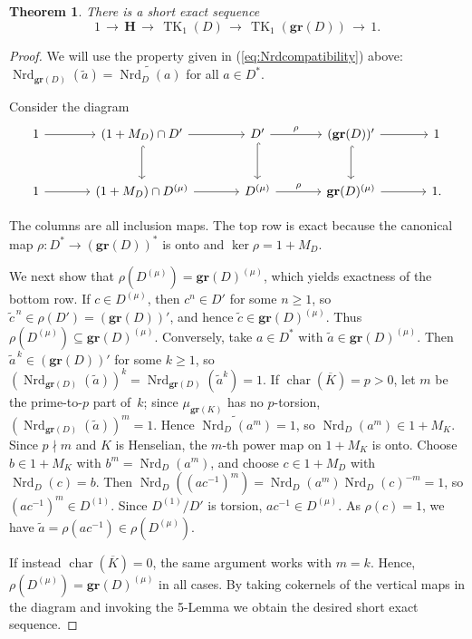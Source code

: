 \documentclass[11pt]{article}
\numberwithin{equation}{section}
\theoremstyle{plain}
\newtheorem{theorem}{Theorem}[section]
\theoremstyle{remark}
\newcommand{\gr}{\mathbf{gr}}
\newcommand{\opn}{\operatorname}
\newcommand{\Dmu}{D^{(\mu)}}
\newcommand{\Nrd}{\opn{Nrd}}
\newcommand{\upmu}{{(\mu)}}
\begin{document}
\begin{theorem}
\label{thm:valued-tk1-exact-sequence}
There is a short exact sequence
\begin{equation}
\label{SESforH}
        1\,\longrightarrow \,\mathbf{H}\,\longrightarrow \,\operatorname{TK}_1(D)\,\longrightarrow\, 
        \operatorname{TK}_1(\gr(D))\,\longrightarrow \,1.
\end{equation}

\end{theorem}
\begin{proof}
We will use  the property  given in (\ref{eq:Nrdcompatibility}) above:  $\operatorname{Nrd}_{\gr(D)}(\widetilde a)=\widetilde{\operatorname{Nrd}_D(a)}$ for all $a\in D^*$.

 Consider the diagram
$$
\begin{tikzcd}[column sep=large,row sep=large]
1 \arrow[r]
& (1+M_D)\cap D' \arrow[r] \arrow[d,hook]
& D' \arrow[r,"\rho"] \arrow[d,hook]
& (\gr(D))' \arrow[r] \arrow[d,hook]
& 1 \\
1 \arrow[r]
& (1+M_D)\cap \Dmu \arrow[r]
& \Dmu  \arrow[r,"\rho"]
& \gr(D)^{(\mu)} \arrow[r]
& 1 .
\end{tikzcd}
$$

The columns are all inclusion maps.
The top row is exact because the canonical map ${\rho\colon D^*\to(\gr(D))^*}$ is onto and $\ker\rho=1+M_D$. 

We next show that 
$\rho(\Dmu)=\gr(D)^{(\mu)}$, which yields exactness of the bottom row.
If ${c\in \Dmu}$, then $c^n\in D'$ for some $n\ge 1$, so $\widetilde c^{\,n}\in\rho(D')=(\gr(D))'$, 
and hence $\widetilde c\in \gr(D)^\upmu$. Thus 
${\rho(\Dmu)\subseteq \gr(D)^\upmu}$. Conversely, take $a\in D^*$ with 
$\widetilde a\in \gr(D)^\upmu$. Then $\widetilde a^{\,k}\in(\gr(D))'$ 
for some $k\geq1$, so $(\Nrd_{\gr(D)}(\widetilde a))^k = \Nrd_{\gr(D)}(\widetilde a^k)=1$. 
If $\operatorname{char}(\overline K)=p>0$, 
let $m$ be the prime-to-$p$ part of~$k$; since $\mu_{\gr(K)}$ has no $p$-torsion, $(\Nrd_{\gr(D)}(\widetilde a))^m=1$. 
Hence $\widetilde{\Nrd_D(a^m)}=1$, so $\operatorname{Nrd}_D(a^m)\in1+M_K$. Since $p\nmid m$ and 
$K$ is Henselian, the $m$-th power map on $1+M_K$ is onto. Choose $b\in1+M_K$ with $b^m=\Nrd_D(a^m)$, and 
choose $c\in1+M_D$ with $\Nrd_D(c)=b$. Then $\Nrd_D((ac^{-1})^m) =\Nrd_D(a^m)\Nrd_D(c)^{-m}=1$, 
so $(ac^{-1})^m\in D^{(1)}$. Since $D^{(1)}/D'$ is torsion, $ac^{-1}\in \Dmu$. As $\rho(c)=1$, we have 
$\widetilde a=\rho(ac^{-1})\in\rho(\Dmu)$.

If instead $\operatorname{char}(\overline K)=0$, the same argument works with $m=k$. Hence, 
$\rho(\Dmu)= \gr(D)^\upmu$
in all cases.
By taking cokernels of the vertical maps in the diagram and invoking the 5-Lemma we obtain the desired short exact 
sequence. \end{proof}
\end{document}
